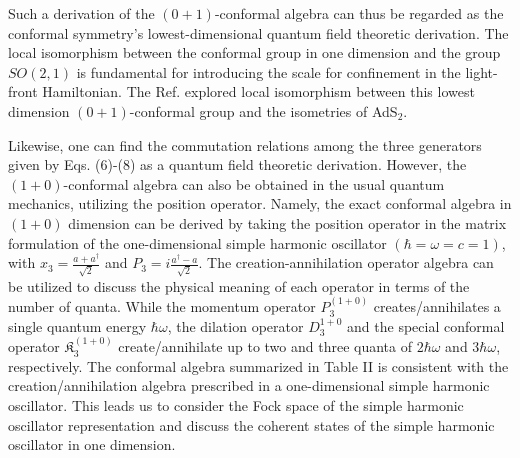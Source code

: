 \documentclass[%
 reprint,
superscriptaddress,
 amsmath,amssymb,
 aps,
]{revtex4-2}
\begin{document}
Such a derivation of the $(0+1)$-conformal algebra can thus be regarded as the conformal symmetry's lowest-dimensional quantum field theoretic derivation. The local isomorphism between the conformal group in one dimension and the group
$SO(2, 1)$ is fundamental for introducing the scale for confinement in the light-front
Hamiltonian. The Ref.\cite{Brodsky_2015} explored local isomorphism between this lowest dimension $(0+1)$-conformal group and the isometries of AdS$_2$.

\begin{table}[h!]
\centering
\caption{\label{tabelinterpolationifd10}$1+0$ conformal algebra in IFD}
\end{table}

Likewise, one can find the commutation relations among the three generators given by Eqs. (6)-(8) as a quantum field theoretic derivation. 
However, the $(1+0)$-conformal algebra can also be obtained in the usual quantum mechanics, utilizing the position operator. Namely, the exact conformal algebra in $(1+0)$ dimension can be derived by taking the position operator in the matrix formulation of the one-dimensional simple harmonic oscillator $(\hbar=\omega=c=1)$, with $x_3=\frac{a+a^{\dagger}}{\sqrt{2}}$ and $P_3=i\frac{a^{\dagger}-a}{\sqrt{2}}$.
The creation-annihilation operator algebra can be utilized to discuss the physical meaning of each operator in terms of the number of quanta. While the momentum operator $P_3^{(1+0)}$ creates/annihilates a single quantum energy $\hbar \omega$, the dilation operator $D_3^{1+0}$ and the special conformal operator $\mathfrak{K}_{{3}}^{(1+0)}$ create/annihilate up to two and three quanta of $2\hbar\omega$ and $3\hbar\omega$, respectively.
The conformal algebra summarized in Table II is consistent with the creation/annihilation algebra prescribed in a one-dimensional simple harmonic oscillator.  
This leads us to consider the Fock space of the simple harmonic oscillator representation and discuss the coherent states of the simple harmonic oscillator in one dimension. 
\end{document}
